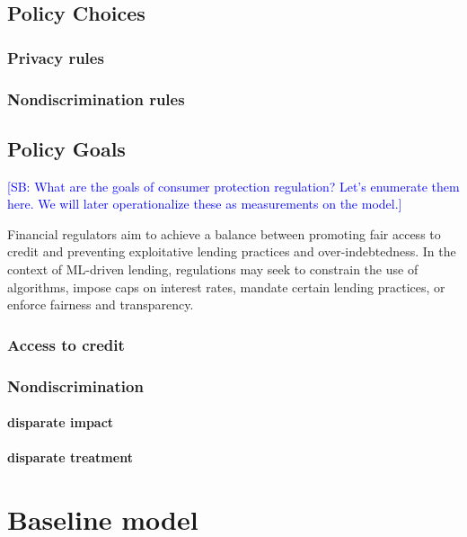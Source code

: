 \documentclass[acmsmall]{acmart}
\newcommand{\spb}[1]{\textcolor{blue}{[SB: #1]}}
\begin{document}
\subsection{Policy Choices}

\subsubsection{Privacy rules}

\subsubsection{Nondiscrimination rules}

\subsection{Policy Goals}

\spb{What are the goals of consumer protection regulation? Let's enumerate them here. We will later operationalize these as measurements on the model.}

Financial regulators aim to achieve a balance between promoting fair access to credit and preventing exploitative lending practices and over-indebtedness. In the context of ML-driven lending, regulations may seek to constrain the use of algorithms, impose caps on interest rates, mandate certain lending practices, or enforce fairness and transparency.

\subsubsection{Access to credit}

\subsubsection{Nondiscrimination}

\paragraph{disparate impact}

\paragraph{disparate treatment}



\section{Baseline model}
\end{document}
